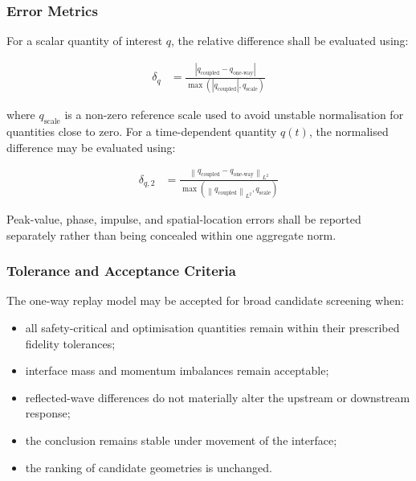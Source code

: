 \subsubsection{Error Metrics}
\label{sec:res-ver-tst-coupling-mode-error-metrics}

For a scalar quantity of interest $q$, the relative difference shall be
evaluated using:

\begin{align}
  \delta_q
  &=
  \frac{
    \left| q_{\mathrm{coupled}} - q_{\mathrm{one\mbox{-}way}} \right|
  }{
    \max \left( \left|q_{\mathrm{coupled}}\right|, q_{\mathrm{scale}} \right)
  }
  \label{eq:res-ver-tst-coupling-relative-difference}
\end{align}

where $q_{\mathrm{scale}}$ is a non-zero reference scale used to avoid
unstable normalisation for quantities close to zero. For a
time-dependent quantity $q(t)$, the normalised difference may be
evaluated using:

\begin{align}
  \delta_{q,2}
  &=
  \frac{
    \left\| q_{\mathrm{coupled}} - q_{\mathrm{one\mbox{-}way}} \right\|_{L^2}
  }{
    \max \left( \left\| q_{\mathrm{coupled}} \right\|_{L^2}, q_{\mathrm{scale}} \right)
  }
  \label{eq:res-ver-tst-coupling-time-series-difference}
\end{align}

Peak-value, phase, impulse, and spatial-location errors shall be
reported separately rather than being concealed within one aggregate
norm.

\subsubsection{Tolerance and Acceptance Criteria}
\label{sec:res-ver-tst-coupling-mode-acceptance}

The one-way replay model may be accepted for broad candidate screening
when:

\begin{itemize}
  \item all safety-critical and optimisation quantities remain within
    their prescribed fidelity tolerances;
  \item interface mass and momentum imbalances remain acceptable;
  \item reflected-wave differences do not materially alter the upstream
    or downstream response;
  \item the conclusion remains stable under movement of the interface;
  \item the ranking of candidate geometries is unchanged.
\end{itemize}

